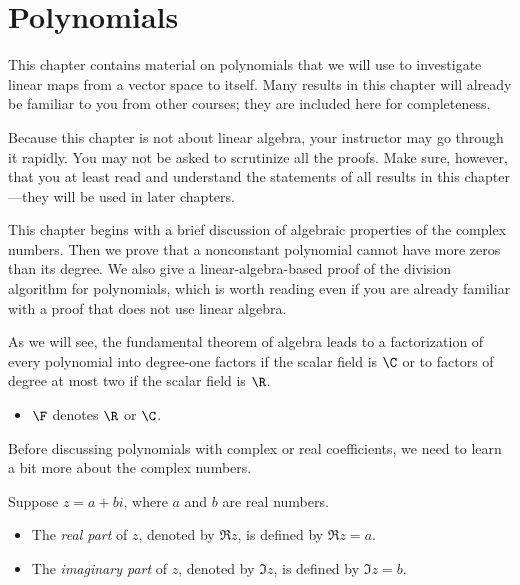 \chapter{Polynomials}
\renewcommand\thesection{\thechapter}

This chapter contains material on polynomials that we will use to investigate
linear maps from a vector space to itself. Many results in this chapter will
already be familiar to you from other courses; they are included here for
completeness.

Because this chapter is not about linear algebra, your instructor may go
through it rapidly. You may not be asked to scrutinize all the proofs. Make
sure, however, that you at least read and understand the statements of all
results in this chapter---they will be used in later chapters.

This chapter begins with a brief discussion of algebraic properties of the
complex numbers. Then we prove that a nonconstant polynomial cannot have more
zeros than its degree. We also give a linear-algebra-based proof of the
division algorithm for polynomials, which is worth reading even if you are
already familiar with a proof that does not use linear algebra.

As we will see, the fundamental theorem of algebra leads to a factorization of
every polynomial into degree-one factors if the scalar field is $\C$ or to
factors of degree at most two if the scalar field is $\R$.

\begin{definition*}\leavevmode
\begin{itemize}
\item $\F$ denotes $\R$ or $\C$.
\end{itemize}
\end{definition*}

Before discussing polynomials with complex or real coefficients, we need to
learn a bit more about the complex numbers.

\begin{definition}\label{ax:4.1}
Suppose $z=a+bi$, where $a$ and $b$ are real numbers.
\begin{itemize}
\item The \emph{real part} of $z$, denoted by $\Re z$, is defined by
  $\Re z=a$.
\item The \emph{imaginary part} of $z$, denoted by $\Im z$, is defined by
  $\Im z=b$.
\end{itemize}
\end{definition}

